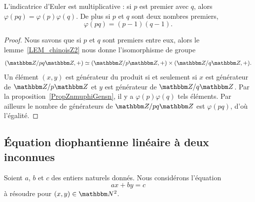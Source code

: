 \begin{corollary}       \label{CorlvTmsf}
    L'indicatrice d'Euler est multiplicative : si \( p\) est premier avec \( q\), alors \( \varphi(pq)=\varphi(p)\varphi(q)\). De plus si \( p\) et \( q\) sont deux nombres premiers,
    \begin{equation}
        \varphi(pq)=(p-1)(q-1).
    \end{equation}
\end{corollary}

\begin{proof}
    Nous savons que si \( p\) et \( q\) sont premiers entre eux, alors le lemme~\ref{LEM_chinoisZ2} nous donne l'isomorphisme de groupe
    \begin{equation}
        (\eZ/pq\eZ,+)\simeq(\eZ/p\eZ,+)\times(\eZ/q\eZ,+).
    \end{equation}
    Un élément \( (x,y)\) est générateur du produit si et seulement si \( x\) est générateur de \( \eZ/p\eZ\) et \( y\) est générateur de \( \eZ/q\eZ\). Par la proposition~\ref{PropZnmuphiGensn}, il y a \( \varphi(p)\varphi(q)\) tels éléments. Par ailleurs le nombre de générateurs de \( \eZ/pq\eZ\) est \( \varphi(pq)\), d'où l'égalité.
\end{proof}

\subsection{Équation diophantienne linéaire à deux inconnues}
\label{subsecZVKNooXNjPSf}



Soient \( a\), \( b\) et \( c\) des entiers naturels donnés. Nous considérons l'équation
\begin{equation}        \label{EqTOVSooJbxlIq}
    ax+by=c
\end{equation}
à résoudre\cite{PAYUooYVuNAB} pour \( (x,y)\in \eN^2\).


